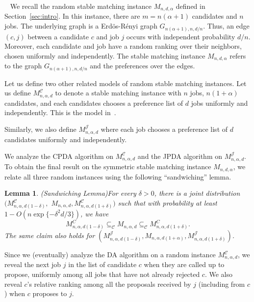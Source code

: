 \documentclass[11pt]{amsart}
\newtheorem{lemma}[theorem]{Lemma}
\newcommand{\pparagraph}[1]{
\vspace{0.13in}\noindent{\textbf{\boldmath #1}}~}
\begin{document}
\pparagraph{Deferred Acceptance on Random Instances.}
We recall the random stable matching instance $M_{n, d, \alpha}$ defined in Section~\ref{sec:intro}.
In this instance, there are $m = n(\alpha+1)$ candidates and $n$ jobs.  The underlying graph is a Erd\"{o}s-R\'{e}nyi graph $G_{n(\alpha+1), n, d/n}$. Thus, an edge $(c, j)$ between a candidate $c$ and job $j$ occurs with independent probability $d/n$. Moreover, each candidate and job have a random ranking over their neighbors, chosen uniformly and independently.  The stable matching instance $M_{n, d, \alpha}$ refers to the graph $G_{n(\alpha+1), n, d/n}$ and the preferences over the edges.  

Let us define two other related models of random stable matching instances. 
 Let us define $M^{\mathcal{C}}_{n,\alpha,d}$ to denote a stable matching instance with $n$ jobs, $n(1+\alpha)$ candidates, and each candidates chooses a preference list of $d$ jobs uniformly and independently. This is the model in~\cite{kanoria2021matching}.
 
 Similarly, we also define $M^{\mathcal{J}}_{n,\alpha,d}$ where each job chooses a preference list of $d$ candidates uniformly and independently.

We analyze the CPDA algorithm on $M^{\mathcal{C}}_{n,\alpha,d}$ and the JPDA algorithm on $M^{\mathcal{J}}_{n,\alpha,d}$.  To obtain the final result on the symmetric stable matching instance  $M_{n, d, \alpha}$, we relate all three random instances using the following ``sandwiching'' lemma.


\begin{lemma}(Sandwiching Lemma)\label{lem:sandwich}
For every $\delta > 0$, there is a joint distribution
$(M^{\mathcal{C}}_{n,\alpha,d(1-\delta)},$ $M_{n,\alpha,d},M^{\mathcal{C}}_{n,\alpha,d(1 + \delta)})$ such that with probability at least $1 - O\left(n\exp\{-\delta^2 d/3\}\right)$, we have 
\[
M^C_{n,\alpha,d(1-\delta)} \subseteq_{\mathcal{C}} M_{n,\alpha,d} \subseteq_{\mathcal{C}} M^C_{n,\alpha,d(1 + \delta)}.
\]
The same claim also holds for $(M^{\mathcal{J}}_{n,\alpha, d(1-\delta)}, M_{n,\alpha,d(1+\alpha)},M^{\mathcal{J}}_{n,\alpha, d(1+\delta)})$.
\end{lemma}

Since we (eventually) analyze the DA algorithm on a random instance $M_{n,\alpha, d}^{\mathcal{C}}$, we reveal the next job $j$ in the list of candidate $c$ when they are called up to propose, uniformly among all jobs that have not already rejected $c$. We also reveal $c$'s relative ranking among all the proposals received by $j$ (including from $c$) when $c$ proposes to $j$.
\end{document}
